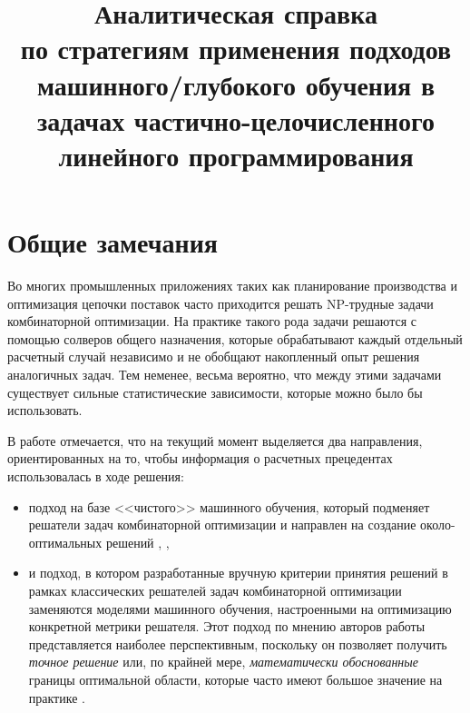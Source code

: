 \documentclass[%
	11pt,
	a4paper,
	utf8,
		]{article}
\begin{document}
\title{Аналитическая справка \\по стратегиям применения подходов машинного/глубокого обучения в задачах частично-целочисленного линейного программирования}


\date{}
\maketitle

\thispagestyle{fancy}



\tableofcontents

\section{Общие замечания}

Во многих промышленных приложениях таких как планирование производства и оптимизация цепочки поставок часто приходится решать NP-трудные задачи комбинаторной оптимизации. На практике такого рода задачи решаются с помощью солверов общего назначения, которые обрабатывают каждый отдельный расчетный случай независимо и не обобщают накопленный опыт решения аналогичных задач. Тем неменее, весьма вероятно, что между этими задачами существует сильные статистические зависимости, которые можно было бы использовать.

В работе \cite{prouvost:ecole-2020} отмечается, что на текущий момент выделяется два направления, ориентированных на то, чтобы информация о расчетных прецедентах использовалась в ходе решения:
\begin{itemize}
	\item подход на базе <<чистого>> машинного обучения, который подменяет решатели задач комбинаторной оптимизации и направлен на создание около-оптимальных решений \cite{bello:neural-comb-opt-2017}, \cite{dai:comb-opt-algo-graphs-2017}, \cite{kool-2019}

	\item и подход, в котором разработанные вручную критерии принятия решений в рамках классических решателей задач комбинаторной оптимизации заменяются моделями машинного обучения, настроенными на оптимизацию конкретной метрики решателя. Этот подход по мнению авторов работы \cite{prouvost:ecole-2020} представляется наиболее перспективным, поскольку он позволяет получить \emph{точное решение} или, по крайней мере, \emph{математически обоснованные} границы оптимальной области, которые часто имеют большое значение на практике \cite{bengio:ml-comb-2020}.
\end{itemize}
\end{document}
